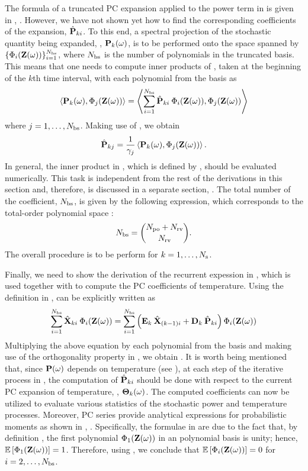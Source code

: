 The formula of a truncated PC expansion applied to the power term in  is given in , . However, we have not shown yet how to find the corresponding coefficients of the expansion, $\hat{\mathbf{P}}_{ki}$. To this end, a spectral projection of the stochastic quantity being expanded, \ie, $\mathbf{P}_k(\omega)$, is to be performed onto the space spanned by $\{ \Phi_i(\mathbf{Z}(\omega)) \}_{i = 1}^{{N_\text{bs}}}$, where ${N_\text{bs}}$ is the number of polynomials in the truncated basis. This means that one needs to compute inner products of , taken at the beginning of the $k$th time interval, with each polynomial from the basis as
\[
  \oInner{\vP_k(\o)}{\pcb_j(\vZ(\o))} = \oInner{\sum_{i=1}^{\pcterms} \pcc{\vP}_{ki} \: \pcb_i(\vZ(\o))}{\pcb_j(\vZ(\o))}
\]
where $j = 1, \dotsc, {N_\text{bs}}$. Making use of , we obtain
\begin{equation} \elabel{pc-coefficients}
  \pcc{\vP}_{kj} = \frac{1}{\pcn_j} \oInner{\vP_k(\o)}{\pcb_j(\vZ(\o))}.
\end{equation}
In general, the inner product in , which is defined by , should be evaluated numerically. This task is independent from the rest of the derivations in this section and, therefore, is discussed in a separate section, . The total number of the coefficient, ${N_\text{bs}}$, is given by the following expression, which corresponds to the total-order polynomial space \cite{beck2011}:
\begin{equation} \elabel{pc-terms}
  \pcterms = { \pcorder + \vars \choose \vars }.
\end{equation}
The overall procedure is to be perform for $k = 1, \dotsc, N_\text{s}$.

Finally, we need to show the derivation of the recurrent expession in , which is used together with  to compute the PC coefficients of temperature. Using the definition in ,  can be explicitly written as
\[
  \sum_{i = 1}^{\pcterms} \pcc{\vX}_{ki} \: \pcb_i(\vZ(\o)) = \sum_{i = 1}^{\pcterms} \left( \mE_k \: \pcc{\vX}_{(k - 1)i} + \mD_k \: \pcc{\vP}_{ki} \right) \pcb_i(\vZ(\o))
\]
Multiplying the above equation by each polynomial from the basis and making use of the orthogonality property in , we obtain . It is worth being mentioned that, since $\mathbf{P}(\omega)$ depends on temperature (see ), at each step of the iterative process in , the computation of $\hat{\mathbf{P}}_{ki}$ should be done with respect to the current PC expansion of temperature, \ie, ${\boldsymbol\Theta}_k(\omega)$. The computed coefficients can now be utilized to evaluate various statistics of the stochastic power and temperature processes. Moreover, PC series provide analytical expressions for probabilistic moments as shown in , . Specifically, the formulae in  are due to the fact that, by definition \cite{xiu2010}, the first polynomial $\Phi_1(\mathbf{Z}(\omega))$ in an polynomial basis is unity; hence, $\mathbb{E}\left[\Phi_1(\mathbf{Z}(\omega))\right] = 1$. Therefore, using , we conclude that $\mathbb{E}\left[\Phi_i(\mathbf{Z}(\omega))\right] = 0$ for $i = 2, \dotsc, {N_\text{bs}}$.

